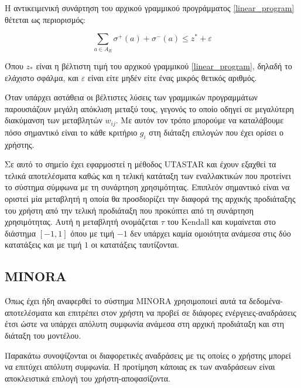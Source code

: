 \documentclass[11pt,a4paper,titlepage]{article}
\numberwithin{equation}{section}
\begin{document}
Η αντικειμενική συνάρτηση του αρχικού γραμμικού προγράμματος \eqref{linear_program} θέτεται ως περιορισμός:

\begin{equation}\label{eq:sens-analysis-constr}
	\sum_{a\in A_{R}} {σ^{+}(a) + σ^{-}(a)} \leq z^{*} + ε
\end{equation}

Όπου $z_{*}$ είναι η βέλτιστη τιμή του αρχικού γραμμικού \ref{linear_program}, δηλαδή το ελάχιστο σφάλμα, και $ε$ είναι είτε μηδέν είτε ένας μικρός θετικός αριθμός. 

Όταν υπάρχει αστάθεια οι βέλτιστες λύσεις των γραμμικών προγραμμάτων παρουσιάζουν μεγάλη απόκλιση μεταξύ τους, γεγονός το οποίο οδηγεί σε μεγαλύτερη διακύμανση των μεταβλητών $w_{ij}$. Με αυτόν τον τρόπο μπορούμε να καταλάβουμε πόσο σημαντικό είναι το κάθε κριτήριο $g_{i}$ στη διάταξη επιλογών που έχει ορίσει ο χρήστης.

Σε αυτό το σημείο έχει εφαρμοστεί η μέθοδος UTASTAR και έχουν εξαχθεί τα τελικά αποτελέσματα καθώς και η τελική κατάταξη των εναλλακτικών που προτείνει το σύστημα σύμφωνα με τη συνάρτηση χρησιμότητας.
Επιπλεόν σημαντικό είναι να οριστεί μία μεταβλητή η οποία θα προσδιορίζει την διαφορά της αρχικής προδιάταξης του χρήστη από την τελική προδιάταξη που προκύπτει από τη συνάρτηση χρησιμότητας. Αυτή η μεταβλητή ονομάζεται $τ$ του Kendall και κυμαίνεται στο διάστημα $[-1,1]$ όπου με τιμή $-1$ δεν υπάρχει καμία ομοιότητα ανάμεσα στις δύο κατατάξεις και με τιμή $1$ οι κατατάξεις ταυτίζονται.

\subsection{MINORA}
\label{ssec:minora-theory}
Όπως έχει ήδη αναφερθεί το σύστημα MINORA χρησιμοποιεί αυτά τα δεδομένα-αποτελέσματα και επιτρέπει στον χρήστη να προβεί σε διάφορες ενέργειες-αναδράσεις έτσι ώστε να υπάρχει απόλυτη συμφωνία ανάμεσα στη αρχική προδιάταξη και στη διάταξη του μοντέλου.

Παρακάτω συνοψίζονται οι διαφορετικές αναδράσεις με τις οποίες ο χρήστης μπορεί να επιτύχει απόλυτη συμφωνία. Η προτίμηση κάποιας εκ των αναδράσεων είναι αποκλειστικά επιλογή του χρήστη-αποφασίζοντα.
\end{document}
